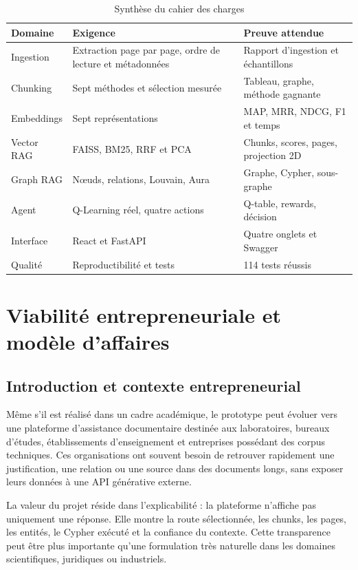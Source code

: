 \documentclass[12pt,a4paper,oneside]{report}
\begin{document}
\begin{table}[H]
\centering
\caption{Synthèse du cahier des charges}
\begin{tabularx}{\textwidth}{p{}X p{}}
\toprule
\textbf{Domaine} & \textbf{Exigence} & \textbf{Preuve attendue}\\
\midrule
Ingestion & Extraction page par page, ordre de lecture et métadonnées & Rapport d'ingestion et échantillons\\
Chunking & Sept méthodes et sélection mesurée & Tableau, graphe, méthode gagnante\\
Embeddings & Sept représentations & MAP, MRR, NDCG, F1 et temps\\
Vector RAG & FAISS, BM25, RRF et PCA & Chunks, scores, pages, projection 2D\\
Graph RAG & Nœuds, relations, Louvain, Aura & Graphe, Cypher, sous-graphe\\
Agent & Q-Learning réel, quatre actions & Q-table, rewards, décision\\
Interface & React et FastAPI & Quatre onglets et Swagger\\
Qualité & Reproductibilité et tests & 114 tests réussis\\
\bottomrule
\end{tabularx}
\end{table}

\section{Viabilité entrepreneuriale et modèle d'affaires}
\subsection{Introduction et contexte entrepreneurial}
Même s'il est réalisé dans un cadre académique, le prototype peut évoluer vers une plateforme d'assistance documentaire destinée aux laboratoires, bureaux d'études, établissements d'enseignement et entreprises possédant des corpus techniques. Ces organisations ont souvent besoin de retrouver rapidement une justification, une relation ou une source dans des documents longs, sans exposer leurs données à une API générative externe.

La valeur du projet réside dans l'explicabilité : la plateforme n'affiche pas uniquement une réponse. Elle montre la route sélectionnée, les chunks, les pages, les entités, le Cypher exécuté et la confiance du contexte. Cette transparence peut être plus importante qu'une formulation très naturelle dans les domaines scientifiques, juridiques ou industriels.
\end{document}

